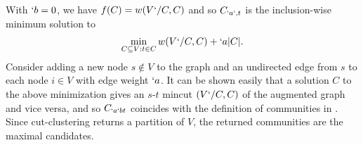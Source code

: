 \begin{Proof}
  With $`b=0$, we have $f(C)=w(V`/C,C)$ and so $C_{`a`,t}$ is the
  inclusion-wise minimum solution to
  \begin{align*}
    \min_{C\subseteq V:t\in C} w(V`/C,C) + `a\lvert C\rvert.
  \end{align*}
  Consider adding a new node $s\not\in V$ to the graph and an
  undirected edge from $s$ to each node $i\in V$ with edge weight
  $`a$. It can be shown easily that a solution $C$ to the above
  minimization gives an $s$-$t$ mincut $(V`/C,C)$ of the augmented graph and
  vice versa, and so $C_{`a`bt}$ coincides with the definition of
  communities in \cite[Lemma~3.1]{flake:cut-clustering}. Since
  cut-clustering returns a partition of $V$, the returned communities
  are the maximal candidates.
  

\end{Proof}




